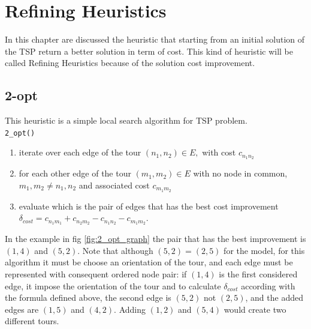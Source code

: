 \chapter{Refining Heuristics}
In this chapter are discussed the heuristic that starting from an initial solution of the TSP return a better solution in term of cost. This kind of heuristic will be called Refining Heuristics because of the solution cost improvement. 

\section{2-opt} \label{sec:best_2_opt}

This heuristic is a simple local search algorithm for TSP problem.\\
\texttt{2\_opt()} 
\begin{enumerate}
	\item iterate over each edge of the tour $ (n_1,n_2) \in E, $ with cost $ c_{n_1n_2} $
	\item for each other edge of the tour $ (m_1, m_2) \in E $ with no node in common, $ m_1,m_2 \ne n_1,n_2 $ and associated cost $ c_{m_1m_2} $
	\item evaluate which is the pair of edges that has the best cost improvement $ \delta_{cost} = c_{n_1m_1} + c_{n_2m_2} - c_{n_1n_2} - c_{m_1m_2} $.
\end{enumerate}
In the example in fig \ref{fig:2_opt_graph} the pair that has the best improvement is $ (1,4) $ and $ (5,2) $. Note that although $ (5,2) = (2,5) $ for the model, for this algorithm it must be choose an orientation of the tour, and each edge must be represented with consequent ordered node pair: if $ (1,4) $ is the first considered edge, it impose the orientation of the tour and to calculate $ \delta_{cost} $ according with the formula defined above, the second edge is $ (5,2) $ not $ (2,5) $, and the added edges are $ (1,5) $ and $ (4,2) $. Adding $ (1,2) $ and $ (5,4) $ would create two different tours.


